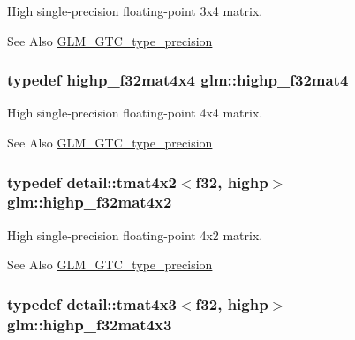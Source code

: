High single-\/precision floating-\/point 3x4 matrix. \begin{DoxySeeAlso}{See Also}
\hyperlink{group__gtc__type__precision}{G\-L\-M\-\_\-\-G\-T\-C\-\_\-type\-\_\-precision} 
\end{DoxySeeAlso}
\hypertarget{group__gtc__type__precision_gac14c1bfb647e39d459c7489ede2156cc}{
\subsubsection[{highp\-\_\-f32mat4}]{\setlength{\rightskip}{0pt plus 5cm}typedef highp\-\_\-f32mat4x4 {\bf glm\-::highp\-\_\-f32mat4}}}\label{group__gtc__type__precision_gac14c1bfb647e39d459c7489ede2156cc}
High single-\/precision floating-\/point 4x4 matrix. \begin{DoxySeeAlso}{See Also}
\hyperlink{group__gtc__type__precision}{G\-L\-M\-\_\-\-G\-T\-C\-\_\-type\-\_\-precision} 
\end{DoxySeeAlso}
\hypertarget{group__gtc__type__precision_ga4d799497b303c2434fe709f81f6bd4dd}{
\subsubsection[{highp\-\_\-f32mat4x2}]{\setlength{\rightskip}{0pt plus 5cm}typedef detail\-::tmat4x2$<$f32, highp$>$ {\bf glm\-::highp\-\_\-f32mat4x2}}}\label{group__gtc__type__precision_ga4d799497b303c2434fe709f81f6bd4dd}
High single-\/precision floating-\/point 4x2 matrix. \begin{DoxySeeAlso}{See Also}
\hyperlink{group__gtc__type__precision}{G\-L\-M\-\_\-\-G\-T\-C\-\_\-type\-\_\-precision} 
\end{DoxySeeAlso}
\hypertarget{group__gtc__type__precision_ga5bd692575886422f501a379386e391d9}{
\subsubsection[{highp\-\_\-f32mat4x3}]{\setlength{\rightskip}{0pt plus 5cm}typedef detail\-::tmat4x3$<$f32, highp$>$ {\bf glm\-::highp\-\_\-f32mat4x3}}}\label{group__gtc__type__precision_ga5bd692575886422f501a379386e391d9}
